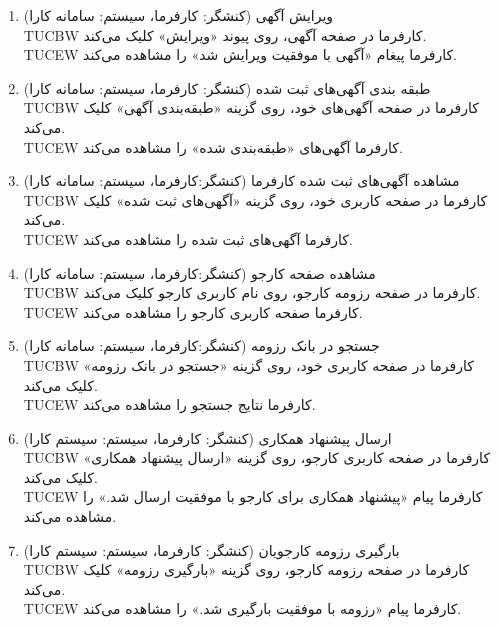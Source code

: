 \documentclass[12pt]{article}
\begin{document}
\begin{enumerate}
		\item
		ویرایش آگهی (کنشگر:‌ کارفرما، سیستم: سامانه کارا)\\
		TUCBW کارفرما در صفحه آگهی، روی پیوند «ویرایش» کلیک می‌کند.\\
		TUCEW کارفرما پیغام «آگهی با موفقیت ویرایش شد» را مشاهده می‌کند.\\

		\item
		طبقه بندی آگهی‌های ثبت شده (کنشگر:‌ کارفرما، سیستم: سامانه کارا)\\
		TUCBW کارفرما در صفحه آگهی‌های خود، روی گزینه «طبقه‌بندی آگهی» کلیک می‌کند.\\
		TUCEW کارفرما آگهی‌های «طبقه‌بندی شده» را مشاهده می‌کند.\\

		\item
		مشاهده آگهی‌های ثبت شده کارفرما (کنشگر:‌کارفرما، سیستم: سامانه کارا)\\
		TUCBW کارفرما در صفحه کاربری خود، روی گزینه «آگهی‌های ثبت شده» کلیک می‌کند.\\
		TUCEW کارفرما آگهی‌های ثبت شده را مشاهده می‌کند.\\

		\item
		مشاهده صفحه کارجو (کنشگر:‌کارفرما، سیستم: سامانه کارا)\\
		TUCBW کارفرما در صفحه رزومه کارجو، روی نام کاربری کارجو کلیک می‌کند.\\
		TUCEW کارفرما صفحه کاربری کارجو را مشاهده می‌کند.\\

		\item
		جستجو در بانک رزومه (کنشگر:‌کارفرما، سیستم: سامانه کارا)\\
		TUCBW کارفرما در صفحه کاربری خود،‌ روی گزینه «جستجو در بانک رزومه» کلیک می‌کند.\\
		TUCEW کارفرما نتایج جستجو را مشاهده می‌کند.\\

		\item
		ارسال پیشنهاد همکاری (کنشگر: کارفرما، سیستم: سیستم کارا)\\
		TUCBW کارفرما در صفحه کاربری کارجو، روی گزینه «ارسال پیشنهاد همکاری» کلیک می‌کند.\\
		TUCEW کارفرما پیام «پیشنهاد همکاری برای کارجو با موفقیت ارسال شد.» را مشاهده می‌کند.\\

		\item
		بارگیری رزومه کارجویان (کنشگر: کارفرما، سیستم: سیستم کارا)\\
		TUCBW کارفرما در صفحه رزومه کارجو، روی گزینه «بارگیری رزومه» کلیک می‌کند.\\
		TUCEW کارفرما پیام «رزومه با موفقیت بارگیری شد.» را مشاهده می‌کند.\\


\end{enumerate}
\end{document}
